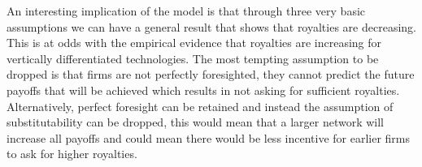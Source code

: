 \documentclass{article}
\begin{document}
\indent An interesting implication of the model is that through three very basic assumptions we can have a general result that shows that royalties are decreasing. This is at odds with the empirical evidence that royalties are increasing for vertically differentiated technologies. The most tempting assumption to be dropped is that firms are not perfectly foresighted, they cannot predict the future payoffs that will be achieved which results in not asking for sufficient royalties. Alternatively, perfect foresight can be retained and instead the assumption of substitutability can be dropped, this would mean that a larger network will increase all payoffs and could mean there would be less incentive for earlier firms to ask for higher royalties. 



\end{document}
